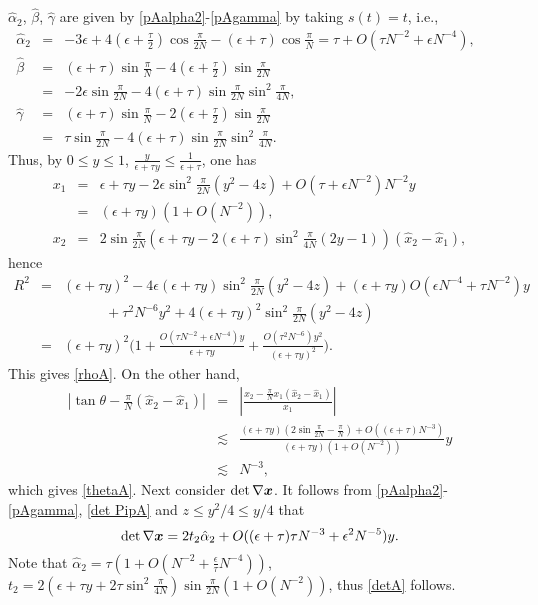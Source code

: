 \documentclass[12pt]{article}
\renewcommand{\vec}[1]{\mbox{\boldmath$#1$}}
\numberwithin{equation}{section}
\begin{document}
$\hat{\alpha}_2$, $\hat{\beta}$, $\hat{\gamma}$ are given by
\eqref{pAalpha2}-\eqref{pAgamma} by taking $s(t)=t$, i.e.,
\begin{eqnarray}
\hat{\alpha}_2&=&-3\epsilon+4(\epsilon+\frac{\tau}{2})\cos{\frac{\pi}{2N}}-
(\epsilon+\tau) \cos{\frac{\pi}{N}}=\tau+O(\tau N^{-2}+\epsilon N^{-4}),
\qquad \label{halpha2} \\
\hat{\beta}&=&(\epsilon+\tau) \sin{\frac{\pi}{N}}-
4(\epsilon+\frac{\tau}{2}) \sin{\frac{\pi}{2N}}\nonumber \\
&=&-2\epsilon \sin{\frac{\pi}{2N}}-4(\epsilon+\tau)\sin{\frac{\pi}{2N}}
\sin^2{\frac{\pi}{4N}}, \label{hbeta} \\
\hat{\gamma}&=&(\epsilon+\tau) \sin{\frac{\pi}{N}}-
2(\epsilon+\frac{\tau}{2}) \sin{\frac{\pi}{2N}}\nonumber \\
&=&\tau\sin{\frac{\pi}{2N}}-4(\epsilon+\tau)\sin{\frac{\pi}{2N}}
\sin^2{\frac{\pi}{4N}}. \label{hgamma}
\end{eqnarray}
Thus, by $0\le y \le 1$, $\frac{y}{\epsilon+\tau y}\le \frac{1}{\epsilon+\tau}$,
one has
\begin{eqnarray*}
x_1&=&\epsilon+\tau y-2\epsilon \sin^2 \frac{\pi}{2N}(y^2-4z)+O(\tau +
\epsilon N^{-2})N^{-2}y\\
&=&(\epsilon+\tau y)(1+O(N^{-2})),\\
x_2&=&2\sin \frac{\pi}{2N}(\epsilon+\tau y-2(\epsilon+\tau)
\sin^2 \frac{\pi}{4N}(2y-1))(\hat{x}_2-\hat{x}_1),
\end{eqnarray*}
hence
\begin{eqnarray*}
R^2&=&(\epsilon+\tau y)^2-4\epsilon(\epsilon+\tau y)
\sin^2 \frac{\pi}{2N}(y^2-4z)+(\epsilon+\tau y)O(\epsilon N^{-4}+\tau N^{-2})y\\
&&\qquad \quad +\tau^2 N^{-6}y^2+4(\epsilon+\tau y)^2 \sin^2 \frac{\pi}{2N}(y^2-4z)\\
&=&(\epsilon+\tau y)^2\Big(1+\frac{O(\tau N^{-2}+\epsilon N^{-4})y}{\epsilon+\tau y}
+\frac{O(\tau^2 N^{-6})y^2}{(\epsilon+\tau y)^2}\Big).
\end{eqnarray*}
This gives \eqref{rhoA}. On the other hand,
\begin{eqnarray*}
|\tan \theta-\frac{\pi}{N}(\hat{x}_2-\hat{x}_1)|
&=&|\frac{x_2-\frac{\pi}{N}x_1(\hat{x}_2-\hat{x}_1)}{x_1}|\\
&\lesssim & \frac{(\epsilon+\tau y)(2\sin \frac{\pi}{2N}-\frac{\pi}{N})
+O((\epsilon+\tau)N^{-3})}{(\epsilon+\tau y)(1+O(N^{-2}))}y\\
&\lesssim&N^{-3},
\end{eqnarray*}
which gives \eqref{thetaA}. Next consider $\det \nabla \vec{x}$. It follows from
\eqref{pAalpha2}-\eqref{pAgamma}, \eqref{det PipA} and $z\le y^2/4 \le y/4$ that
$$
\det \nabla \vec{x}=2t_2 \hat{\alpha}_2+O((\epsilon+\tau)\tau N^{-3}+\epsilon^2N^{-5})y.
$$
Note that $\hat{\alpha}_2=\tau(1+O(N^{-2}+\frac{\epsilon}{\tau}N^{-4}))$,
$t_2=2(\epsilon+\tau y+2\tau \sin^2 \frac{\pi}{4N})\sin \frac{\pi}{2N}(1+O(N^{-2}))$,
thus \eqref{detA} follows.
\end{document}
